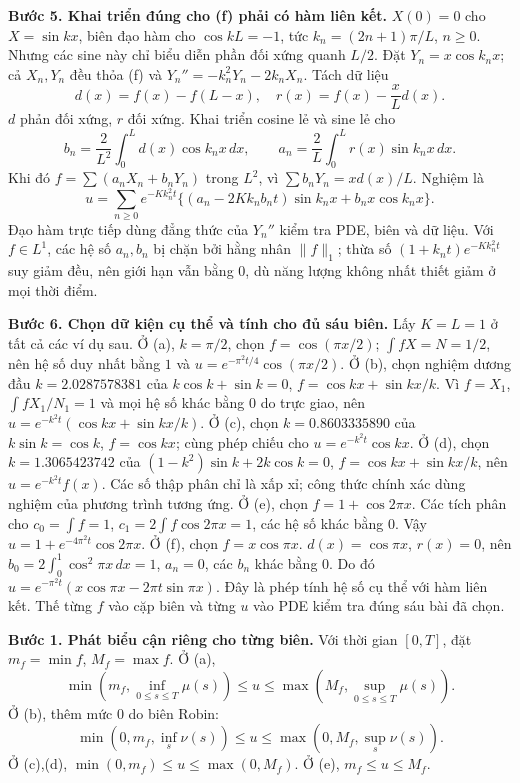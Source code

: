 \textbf{Bước 5. Khai triển đúng cho (f) phải có hàm liên kết.}
$X(0)=0$ cho $X=\sin kx$, biên đạo hàm cho $\cos kL=-1$, tức $k_n=(2n+1)\pi/L$, $n\ge0$. Nhưng các sine này chỉ biểu diễn phần đối xứng quanh $L/2$. Đặt $Y_n=x\cos k_nx$; cả $X_n,Y_n$ đều thỏa (f) và $Y_n''=-k_n^2Y_n-2k_nX_n$. Tách dữ liệu
\[d(x)=f(x)-f(L-x),\quad r(x)=f(x)-\frac xL d(x).\]
$d$ phản đối xứng, $r$ đối xứng. Khai triển cosine lẻ và sine lẻ cho
\[b_n=\frac2{L^2}\int_0^Ld(x)\cos k_nx\,dx,\qquad
a_n=\frac2L\int_0^Lr(x)\sin k_nx\,dx.\]
Khi đó $f=\sum(a_nX_n+b_nY_n)$ trong $L^2$, vì $\sum b_nY_n=xd(x)/L$. Nghiệm là
\[u=\sum_{n\ge0}e^{-Kk_n^2t}
\{(a_n-2Kk_nb_nt)\sin k_nx+b_nx\cos k_nx\}.\]
Đạo hàm trực tiếp dùng đẳng thức của $Y_n''$ kiểm tra PDE, biên và dữ liệu. Với $f\in L^1$, các hệ số $a_n,b_n$ bị chặn bởi hằng nhân $\|f\|_1$; thừa số $(1+k_nt)e^{-Kk_n^2t}$ suy giảm đều, nên giới hạn vẫn bằng $0$, dù năng lượng không nhất thiết giảm ở mọi thời điểm.

\textbf{Bước 6. Chọn dữ kiện cụ thể và tính cho đủ sáu biên.}
Lấy $K=L=1$ ở tất cả các ví dụ sau. Ở (a), $k=\pi/2$, chọn $f=\cos(\pi x/2)$; $\int fX=N=1/2$, nên hệ số duy nhất bằng $1$ và $u=e^{-\pi^2t/4}\cos(\pi x/2)$.
Ở (b), chọn nghiệm dương đầu $k=2.0287578381$ của $k\cos k+\sin k=0$, $f=\cos kx+\sin kx/k$. Vì $f=X_1$, $\int fX_1/N_1=1$ và mọi hệ số khác bằng $0$ do trực giao, nên $u=e^{-k^2t}(\cos kx+\sin kx/k)$. Ở (c), chọn $k=0.8603335890$ của $k\sin k=\cos k$, $f=\cos kx$; cùng phép chiếu cho $u=e^{-k^2t}\cos kx$. Ở (d), chọn $k=1.3065423742$ của $(1-k^2)\sin k+2k\cos k=0$, $f=\cos kx+\sin kx/k$, nên $u=e^{-k^2t}f(x)$. Các số thập phân chỉ là xấp xỉ; công thức chính xác dùng nghiệm của phương trình tương ứng.
Ở (e), chọn $f=1+\cos2\pi x$. Các tích phân cho $c_0=\int f=1$, $c_1=2\int f\cos2\pi x=1$, các hệ số khác bằng $0$. Vậy $u=1+e^{-4\pi^2t}\cos2\pi x$.
Ở (f), chọn $f=x\cos\pi x$. $d(x)=\cos\pi x$, $r(x)=0$, nên $b_0=2\int_0^1\cos^2\pi x\,dx=1$, $a_n=0$, các $b_n$ khác bằng $0$. Do đó $u=e^{-\pi^2t}(x\cos\pi x-2\pi t\sin\pi x)$. Đây là phép tính hệ số cụ thể với hàm liên kết. Thế từng $f$ vào cặp biên và từng $u$ vào PDE kiểm tra đúng sáu bài đã chọn.

\textbf{Bước 1. Phát biểu cận riêng cho từng biên.} Với thời gian $[0,T]$, đặt $m_f=\min f$, $M_f=\max f$. Ở (a),
\[\min(m_f,\inf_{0\le s\le T}\mu(s))\le u\le
\max(M_f,\sup_{0\le s\le T}\mu(s)).\]
Ở (b), thêm mức $0$ do biên Robin:
\[\min(0,m_f,\inf_s\nu(s))\le u\le\max(0,M_f,\sup_s\nu(s)).\]
Ở (c),(d), $\min(0,m_f)\le u\le\max(0,M_f)$. Ở (e), $m_f\le u\le M_f$.

